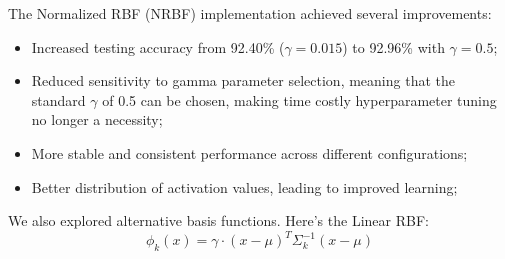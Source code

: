 \documentclass[11pt]{article}
\begin{document}
The Normalized RBF (NRBF) implementation achieved several improvements:
\begin{itemize}
  \setlength{\itemsep}{0pt}
    \item Increased testing accuracy from 92.40\% ($\gamma=0.015$) to 92.96\% with $\gamma=0.5$;
    \item Reduced sensitivity to gamma parameter selection, meaning that the
    standard $\gamma$ of 0.5 can be chosen, making time costly hyperparameter tuning
    no longer a necessity;
    \item More stable and consistent performance across different configurations;
    \item Better distribution of activation values, leading to improved learning;
\end{itemize}

%

We also explored alternative basis functions. Here's the Linear RBF:
\begin{equation}
  \phi_k(x)=\gamma \cdot (x-\mu)^T\Sigma_k^{-1}(x-\mu)
\end{equation}
\end{document}

